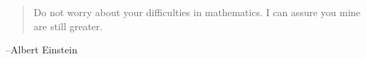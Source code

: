 \documentclass[letterpaper, landscape]{exam}
\begin{document}
  \else
    \vspace{11 cm}
    \begin{quote}
      \begin{em}
         Do not worry about your difficulties in mathematics. I can assure you
         mine are still greater.
      \end{em}
    \end{quote}
    \hspace{1 cm} --Albert Einstein
  \fi
\end{document}
